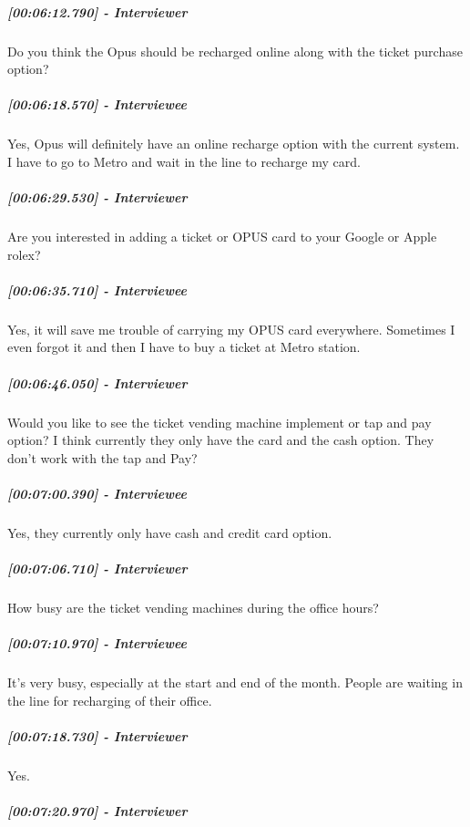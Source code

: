 \documentclass[a4paper,12pt]{article}
\begin{document}
\hypertarget{interviewer-28}{%
\subparagraph{{[}00:06:12.790{]} - Interviewer}\label{interviewer-28}}

Do you think the Opus should be recharged online along with the ticket
purchase option?

\hypertarget{interviewee-23}{%
\subparagraph{{[}00:06:18.570{]} - Interviewee}\label{interviewee-23}}

Yes, Opus will definitely have an online recharge option with the
current system. I have to go to Metro and wait in the line to recharge
my card.

\hypertarget{interviewer-29}{%
\subparagraph{{[}00:06:29.530{]} - Interviewer}\label{interviewer-29}}

Are you interested in adding a ticket or OPUS card to your Google or
Apple rolex?

\hypertarget{interviewee-24}{%
\subparagraph{{[}00:06:35.710{]} - Interviewee}\label{interviewee-24}}

Yes, it will save me trouble of carrying my OPUS card everywhere.
Sometimes I even forgot it and then I have to buy a ticket at Metro
station.

\hypertarget{interviewer-30}{%
\subparagraph{{[}00:06:46.050{]} - Interviewer}\label{interviewer-30}}

Would you like to see the ticket vending machine implement or tap and
pay option? I think currently they only have the card and the cash
option. They don't work with the tap and Pay?

\hypertarget{interviewee-25}{%
\subparagraph{{[}00:07:00.390{]} - Interviewee}\label{interviewee-25}}

Yes, they currently only have cash and credit card option.

\hypertarget{interviewer-31}{%
\subparagraph{{[}00:07:06.710{]} - Interviewer}\label{interviewer-31}}

How busy are the ticket vending machines during the office hours?

\hypertarget{interviewee-26}{%
\subparagraph{{[}00:07:10.970{]} - Interviewee}\label{interviewee-26}}

It's very busy, especially at the start and end of the month. People are
waiting in the line for recharging of their office.

\hypertarget{interviewer-32}{%
\subparagraph{{[}00:07:18.730{]} - Interviewer}\label{interviewer-32}}

Yes.

\hypertarget{interviewer-33}{%
\subparagraph{{[}00:07:20.970{]} - Interviewer}\label{interviewer-33}}
\end{document}
